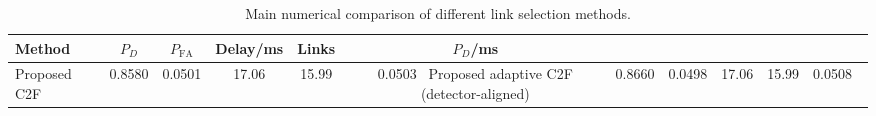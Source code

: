 \begin{table}[t]
    \centering
    \caption{Main numerical comparison of different link selection methods.}
    \label{tab:main_summary}
    \begin{tabular}{l c c c c c}
        \hline
        Method & $P_D$ & $P_{\mathrm{FA}}$ & Delay/ms & Links & $P_D$/ms \\
        \hline
        Proposed C2F & 0.8580 & 0.0501 & 17.06 & 15.99 & 0.0503 \
        Proposed adaptive C2F (detector-aligned) & 0.8660 & 0.0498 & 17.06 & 15.99 & 0.0508 \
        \hline
    \end{tabular}
\end{table}
